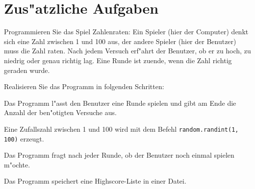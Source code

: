 \section*{Zus"atzliche Aufgaben}

\begin{aufgabe}[Zahlenraten]
Programmieren Sie das Spiel Zahlenraten: Ein Spieler (hier der Computer) denkt sich eine Zahl zwischen 1 und 100 aus, der andere Spieler (hier der Benutzer) muss die Zahl raten. Nach jedem Versuch erf"ahrt der Benutzer, ob er zu hoch, zu niedrig oder genau richtig lag. Eine Runde ist zuende, wenn die Zahl richtig geraden wurde.

Realisieren Sie das Programm in folgenden Schritten:
\begin{teilaufgabe}
Das Programm l"asst den Benutzer eine Runde spielen und gibt am Ende die Anzahl der ben"otigten Versuche aus.

\hinweis Eine Zufallszahl zwischen 1 und 100 wird mit dem Befehl \lstinline{random.randint(1, 100)} erzeugt.
\end{teilaufgabe}
\begin{teilaufgabe}
Das Programm fragt nach jeder Runde, ob der Benutzer noch einmal spielen m"ochte.
\end{teilaufgabe}
\begin{teilaufgabe}
Das Programm speichert eine Highscore-Liste in einer Datei.
\end{teilaufgabe}

\end{aufgabe}


